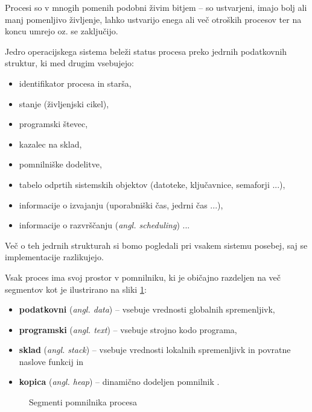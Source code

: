 \documentclass[a4paper,12pt,openright]{book}
\begin{document}
Procesi so v mnogih pomenih podobni živim bitjem -- so ustvarjeni, imajo bolj ali manj pomenljivo življenje, lahko ustvarijo enega ali več otroških procesov ter na koncu umrejo oz. se zaključijo.

Jedro operacijskega sistema beleži status procesa preko jedrnih podatkovnih struktur, ki med drugim vsebujejo:
\begin{itemize}
	\item identifikator procesa in starša,
	\item stanje (življenjski cikel),
	\item programski števec,
	\item kazalec na sklad,
	\item pomnilniške dodelitve,
	\item tabelo odprtih sistemskih objektov (datoteke, ključavnice, semaforji ...),
	\item informacije o izvajanju (uporabniški čas, jedrni čas ...),
	\item informacije o razvrščanju (\textit{angl. scheduling}) ...
\end{itemize}
Več o teh jedrnih strukturah si bomo pogledali pri vsakem sistemu posebej, saj se implementacije razlikujejo.

Vsak proces ima svoj prostor v pomnilniku, ki je običajno razdeljen na več segmentov kot je ilustrirano na sliki \ref{fig:process_memory_segments}:
\begin{itemize}
	\item \textbf{podatkovni} (\textit{angl. data}) -- vsebuje vrednosti globalnih spremenljivk,
	\item \textbf{programski} (\textit{angl. text}) -- vsebuje strojno kodo programa,
	\item \textbf{sklad} (\textit{angl. stack}) -- vsebuje vrednosti lokalnih spremenljivk in povratne naslove funkcij in
	\item \textbf{kopica} (\textit{angl. heap}) -- dinamično dodeljen pomnilnik \cite{Silberschatz_Galvin_Gagne_2018}.
\end{itemize}

\begin{figure}[h!]
	\begin{center}
	\end{center}
	\caption{Segmenti pomnilnika procesa \cite{Silberschatz_Galvin_Gagne_2018}}
	\label{fig:process_memory_segments}
\end{figure}
\end{document}
